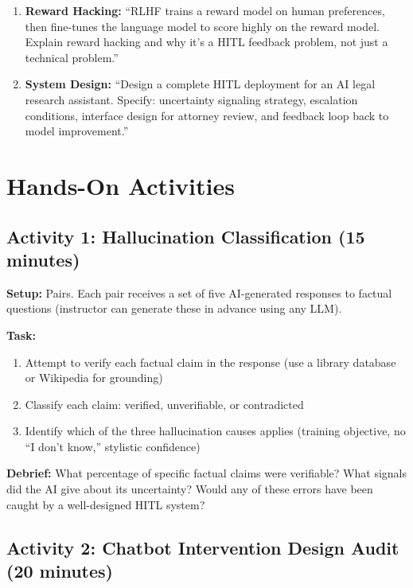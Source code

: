 \begin{enumerate}
    \item \textbf{Reward Hacking:} ``RLHF trains a reward model on human preferences, then fine-tunes the language model to score highly on the reward model. Explain reward hacking and why it's a HITL feedback problem, not just a technical problem.''

    \item \textbf{System Design:} ``Design a complete HITL deployment for an AI legal research assistant. Specify: uncertainty signaling strategy, escalation conditions, interface design for attorney review, and feedback loop back to model improvement.''
\end{enumerate}

\section{Hands-On Activities}

\subsection{Activity 1: Hallucination Classification (15 minutes)}

\textbf{Setup:} Pairs. Each pair receives a set of five AI-generated responses to factual questions (instructor can generate these in advance using any LLM).

\textbf{Task:}
\begin{enumerate}
    \item Attempt to verify each factual claim in the response (use a library database or Wikipedia for grounding)
    \item Classify each claim: verified, unverifiable, or contradicted
    \item Identify which of the three hallucination causes applies (training objective, no ``I don't know,'' stylistic confidence)
\end{enumerate}

\textbf{Debrief:} What percentage of specific factual claims were verifiable? What signals did the AI give about its uncertainty? Would any of these errors have been caught by a well-designed HITL system?

\subsection{Activity 2: Chatbot Intervention Design Audit (20 minutes)}

